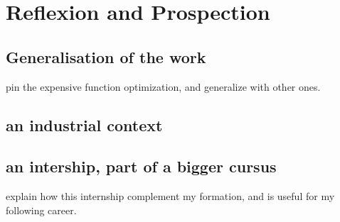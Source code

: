 \chapter{Reflexion and Prospection}

\section{Generalisation of the work}

pin the expensive function optimization, and generalize with other ones. 


\section{an industrial context}


\section{an intership, part of a bigger cursus}

explain how this internship complement my formation, and is useful for my following career. 



